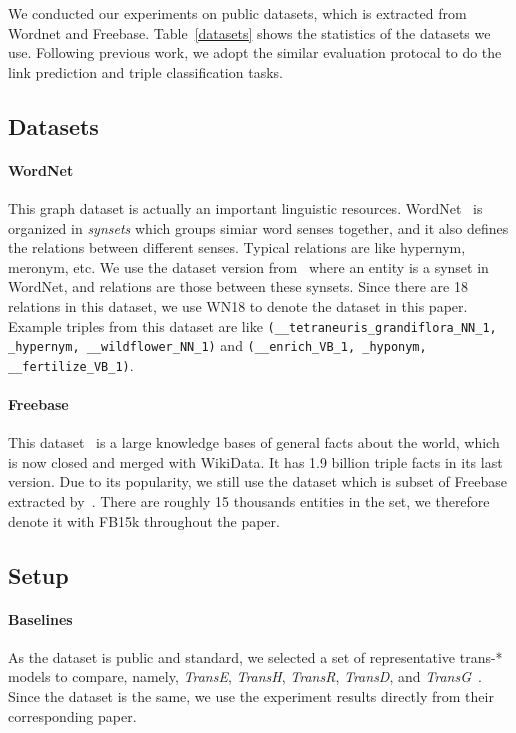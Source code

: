 \documentclass[twocolumn,a4paper,10pt,preprint,3p]{elsarticle}
\begin{document}
We conducted our experiments on public datasets, which is extracted from Wordnet and Freebase. Table~\ref{datasets} shows the statistics of the datasets we use. Following previous work, we adopt the similar evaluation protocal to do the link prediction and triple classification tasks.


\subsection{Datasets}

\paragraph{WordNet} This graph dataset is actually an important linguistic resources. WordNet~\cite{miller1995wordnet} is organized in \emph{synsets} which groups simiar word senses together, and it also defines the relations between different senses. Typical relations are like hypernym, meronym, etc. We use the dataset version from~\cite{bordes2014SME} where an entity is a synset in WordNet, and relations are those between these synsets. Since there are 18 relations in this dataset, we use WN18 to denote the dataset in this paper. Example triples from this dataset are like \texttt{({\_}{\_}tetraneuris{\_}grandiflora{\_}NN{\_}1, {\_}hypernym, {\_}{\_}wildflower{\_}NN{\_}1)} and \texttt{({\_}{\_}enrich{\_}VB{\_}1, {\_}hyponym, {\_}{\_}fertilize{\_}VB{\_}1)}.

\paragraph{Freebase} This dataset~\cite{bollacker2008freebase} is a large knowledge bases of general facts about the world, which is now closed and merged with WikiData. It has 1.9 billion triple facts in its last version. Due to its popularity, we still use the dataset which is subset of Freebase extracted by~\cite{TransE2013}. There are roughly 15 thousands entities in the set, we therefore denote it with FB15k throughout the paper.


\subsection{Setup}

\paragraph{Baselines} As the dataset is public and standard, we selected a set of representative trans-* models to compare, namely, \emph{TransE}, \emph{TransH}, \emph{TransR}, \emph{TransD}, and \emph{TransG}~\cite{TransE2013,TransH2014,TransR2015,TransD,TransG}. Since the dataset is the same, we use the experiment results directly from their corresponding paper.
\end{document}
